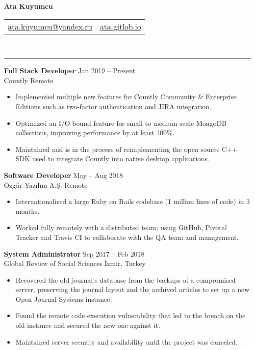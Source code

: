\documentclass[a4paper, 12pt]{article}
\newcommand{\resumeSection}[1]{\vspace{12pt}{\Large \bfseries #1} \vspace{-9pt} \\ \rule{\textwidth}{0.7pt}}
\newcommand{\resumeSubsection}[1]{\textbf{#1}}
\newcommand{\resumeFAIcon}[1]{\makebox[24pt][c]{\faicon{#1}}}
\begin{document}
	\begin{center}
		{\huge \bfseries Ata Kuyumcu}

		\begin{tabular}{c c}
			\href{mailto:ata.kuyumcu@yandex.ru}{ata.kuyumcu@yandex.ru} &
			\href{https://ata.gitlab.io}{ata.gitlab.io}
			
		\end{tabular}
	\end{center}

	\vspace{-20pt}
	\resumeSection{\resumeFAIcon{briefcase}Experience}
	
	\resumeSubsection{Full Stack Developer} \hfill Jan 2019  – Present \\
	Countly \hfill Remote
	
	\begin{itemize}
		\item Implemented multiple new features for Countly Community \& Enterprise Editions such as two-factor authentication and JIRA integration.
		\item Optimized an I/O bound feature for small to medium scale MongoDB collections, improving performance by at least 100\%.
		\item Maintained and is in the process of reimplementing the open source C++ SDK used to integrate Countly into native desktop applications.
	\end{itemize}

	\resumeSubsection{Software Developer} \hfill May – Aug 2018 \\
	Özgür Yazılım A.Ş. \hfill Remote
		
	\begin{itemize}
		\item Internationalized a large Ruby on Rails codebase (1 million lines of code) in 3 months.
		\item Worked fully remotely with a distributed team; using GitHub, Pivotal Tracker and Travis CI to collaborate with the QA team and management.
	\end{itemize}

	\resumeSubsection{System Administrator} \hfill Sep 2017 – Feb 2018 \\
	Global Review of Social Sciences \hfill İzmir, Turkey
	
	\begin{itemize}
		\item Recovered the old journal’s database from the backups of a compromised server, preserving the journal layout and the archived articles to set up a new Open Journal Systems instance.
		\item Found the remote code execution vulnerability that led to the breach on the old instance and secured the new one against it.
		\item Maintained server security and availability until the project was canceled.
	\end{itemize}
	
\end{document}
